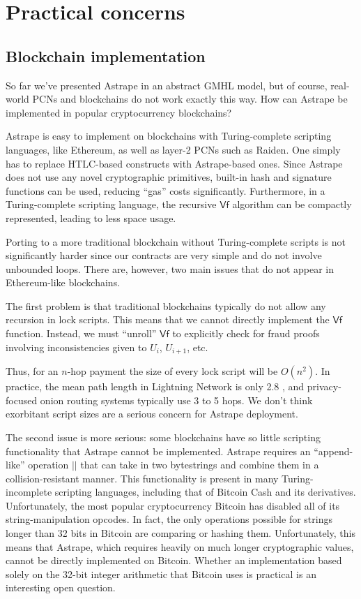 \documentclass[USenglish,oneside,twocolumn]{article}
\begin{document}
\section{Practical concerns} \label{sec:practical}

\subsection{Blockchain implementation}

So far we've presented Astrape in an abstract GMHL model, but of course, real-world PCNs and blockchains do not work exactly this way. How can Astrape be implemented in popular cryptocurrency blockchains?

Astrape is easy to implement on blockchains with Turing-complete scripting languages, like Ethereum, as well as layer-2 PCNs such as Raiden. One simply has to replace HTLC-based constructs with Astrape-based ones. Since Astrape does not use any novel cryptographic primitives, built-in hash and signature functions can be used, reducing ``gas'' costs significantly. Furthermore, in a Turing-complete scripting language, the recursive $\mathsf{Vf}$ algorithm can be compactly represented, leading to less space usage.

Porting to a more traditional blockchain without Turing-complete scripts is not significantly harder since our contracts are very simple and do not involve unbounded loops. There are, however, two main issues that do not appear in Ethereum-like blockchains.

The first problem is that traditional blockchains typically do not allow any recursion in lock scripts. This means that we cannot directly implement the $\mathsf{Vf}$ function. Instead, we must ``unroll'' $\mathsf{Vf}$ to explicitly check for fraud proofs involving inconsistencies given to $U_i$, $U_{i+1}$, etc.

Thus, for an $n$-hop payment the size of every lock script will be $O(n^2)$. In practice, the mean path length in Lightning Network is only 2.8 \cite{seres2019topological}, and privacy-focused onion routing systems typically use 3 to 5 hops. We don't think exorbitant script sizes are a serious concern for Astrape deployment.

The second issue is more serious: some blockchains have so little scripting functionality that Astrape cannot be implemented. Astrape requires an ``append-like'' operation $||$ that can take in two bytestrings and combine them in a collision-resistant manner. This functionality is present in many Turing-incomplete scripting languages, including that of Bitcoin Cash and its derivatives. Unfortunately, the most popular cryptocurrency Bitcoin has disabled all of its string-manipulation opcodes. In fact, the only operations possible for strings longer than 32 bits in Bitcoin are comparing or hashing them. Unfortunately, this means that Astrape, which requires heavily on much longer cryptographic values, cannot be directly implemented on Bitcoin. Whether an implementation based solely on the 32-bit integer arithmetic that Bitcoin uses is practical is an interesting open question.
\end{document}
